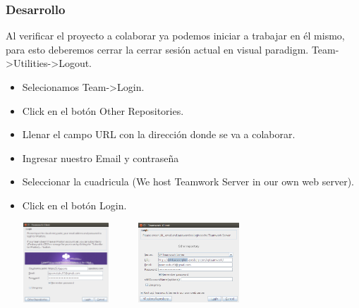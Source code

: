 \documentclass[8pt]{beamer}
\begin{document}
\begin{frame}
\frametitle{Desarrollo}
\setlength{\parskip}{10pt}
Al verificar el proyecto a colaborar ya podemos iniciar a trabajar en él mismo, para esto deberemos cerrar la cerrar sesión actual en visual paradigm. Team->Utilities->Logout.

\setlength{\parskip}{02pt}
\begin{center}
\begin{itemize}
\item{Selecionamos Team->Login.}
\item{Click en el botón Other Repositories.}
\item{Llenar el campo URL con la dirección donde se va a colaborar.}
\item{Ingresar nuestro Email y contraseña}
\item{Seleccionar la cuadricula (We host Teamwork Server in our own web server).}
\item{Click en el botón Login.}
\end{itemize} 

\setlength{\parskip}{08pt}
\includegraphics[width=4.5cm, height=3cm]{img/cap19} \hspace{0.5cm}
\includegraphics[width=4.5cm, height=3cm]{img/cap20}
\end{center}
\end{frame}
\end{document}
